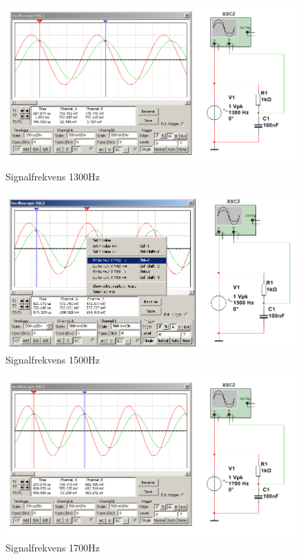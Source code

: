 \documentclass[11pt,a4paper]{article}
\begin{document}
\begin{figure}[H]
    \centering
    \includegraphics[scale=0.5]{ee466multisim/5-1300Hz.png}
    \caption{Signalfrekvens 1300Hz}
    \label{fig:sim-5-1300Hz}
\end{figure}

\begin{figure}[H]
    \centering
    \includegraphics[scale=0.5]{ee466multisim/5-1500Hz.png}
    \caption{Signalfrekvens 1500Hz}
    \label{fig:sim-5-1500Hz}
\end{figure}

\begin{figure}[H]
    \centering
    \includegraphics[scale=0.5]{ee466multisim/5-1700Hz.png}
    \caption{Signalfrekvens 1700Hz}
    \label{fig:sim-5-1700Hz}
\end{figure}
\end{document}
